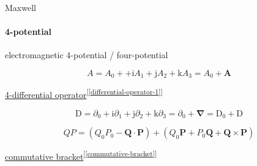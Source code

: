 \documentclass[
]{book}
\theoremstyle{definition}
\theoremstyle{definition}
\theoremstyle{definition}
\theoremstyle{definition}
\theoremstyle{remark}
\begin{document}
Maxwell

\paragraph{4-potential}\label{potential}

electromagnetic 4-potential / four-potential

\[
A=A_{{\scriptscriptstyle 0}}++\mathrm{i}A_{{\scriptscriptstyle 1}}+\mathrm{j}A_{{\scriptscriptstyle 2}}+\mathrm{k}A_{{\scriptscriptstyle 3}}=A_{0}+\boldsymbol{A}
\]

\hyperref[differential-operator-1]{4-differential operator}\textsuperscript{{[}\ref{differential-operator-1}{]}}

\[
\mathrm{D}=\partial_{{\scriptscriptstyle 0}}+\mathrm{i}\partial_{{\scriptscriptstyle 1}}+\mathrm{j}\partial_{{\scriptscriptstyle 2}}+\mathrm{k}\partial_{{\scriptscriptstyle 3}}=\partial_{{\scriptscriptstyle 0}}+\boldsymbol{\nabla}=\mathrm{D}_{{\scriptscriptstyle 0}}+\boldsymbol{\mathrm{D}}
\]

\[
QP=\left(Q_{{\scriptscriptstyle 0}}P_{{\scriptscriptstyle 0}}-\boldsymbol{Q}\cdot\boldsymbol{P}\right)+\left(Q_{{\scriptscriptstyle 0}}\boldsymbol{P}+P_{{\scriptscriptstyle 0}}\boldsymbol{Q}+\boldsymbol{Q}\times\boldsymbol{P}\right)
\]

\hyperref[commutative-bracket]{commutative bracket}\textsuperscript{{[}\ref{commutative-bracket}{]}}
\end{document}
